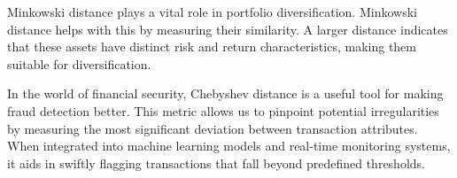 \documentclass[12pt,titlepage]{article}
\begin{document}
Minkowski distance plays a vital role in portfolio diversification. Minkowski distance helps with this by measuring their similarity. A larger distance indicates that these assets have distinct risk and return characteristics, making them suitable for diversification.

In the world of financial security, Chebyshev distance is a useful tool for making fraud detection better. This metric allows us to pinpoint potential irregularities by measuring the most significant deviation between transaction attributes. When integrated into machine learning models and real-time monitoring systems, it aids in swiftly flagging transactions that fall beyond predefined thresholds.
\end{document}

